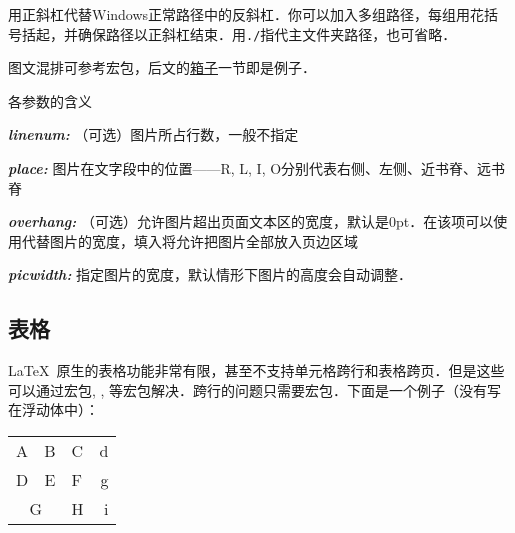 用正斜杠代替Windows正常路径中的反斜杠．你可以加入多组路径，每组用花括号括起，并确保路径以正斜杠结束．用\verb|./|指代主文件夹路径，也可省略．\dpar

图文混排可参考宏包，后文的\hyperref[sec:box]{箱子}一节即是例子．
\begin{latex}
\end{latex}

各参数的含义
\begin{inlinee}
\item {\bfseries\itshape linenum:} （可选）图片所占行数，一般不指定
\item {\bfseries\itshape place:} 图片在文字段中的位置——R, L, I, O分别代表右侧、左侧、近书脊、远书脊
\item {\bfseries\itshape overhang:} （可选）允许图片超出页面文本区的宽度，默认是0pt．在该项可以使用代替图片的宽度，填入将允许把图片全部放入页边区域
\item {\bfseries\itshape picwidth:} 指定图片的宽度，默认情形下图片的高度会自动调整．
\end{inlinee}

\subsection{表格}
\LaTeX\ 原生的表格功能非常有限，甚至不支持单元格跨行和表格跨页．但是这些可以通过宏包, , 等宏包解决．跨行的问题只需要宏包．下面是一个例子（没有写在浮动体中）：

\begin{codeshow}
\begin{center}
  \begin{tabular}[c]{|l|c||p{3em}
    r@{-}} \hline\hline
    A & B & C & d\\D & E & F & g\\
    \cline{1-2}
    \multicolumn{2}{|c|}{G}&H&i\\
    \hline
  \end{tabular}
\end{center}
\end{codeshow}

